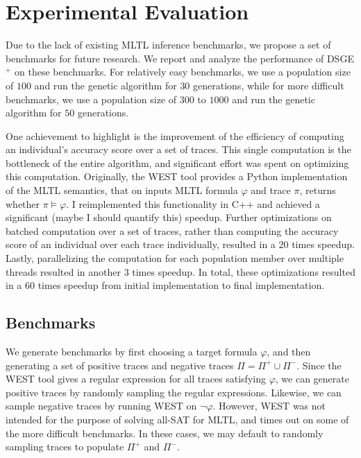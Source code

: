 \documentclass[runningheads]{llncs}
\renewcommand{\phi}{\varphi}
\begin{document}
\section{Experimental Evaluation}
Due to the lack of existing MLTL inference benchmarks, we propose a set of benchmarks for future research.
We report and analyze the performance of DSGE$^+$ on these benchmarks. 
For relatively easy benchmarks, we use a population size of $100$ and run the genetic algorithm for $30$ generations, while for more difficult benchmarks, we use a population size of $300$ to $1000$ and run the genetic algorithm for $50$ generations.

One achievement to highlight is the improvement of the efficiency of computing an individual's accuracy score over a set of traces.
This single computation is the bottleneck of the entire algorithm, and significant effort was spent on optimizing this computation.
Originally, the WEST tool \cite{Elwing_Gamboa-Guzman_Sorkin_Travesset_Wang_Rozier_2024} provides a Python implementation of the MLTL semantics, that on inputs MLTL formula $\phi$ and trace $\pi$, returns whether $\pi \vDash \phi$. 
I reimplemented this functionality in C++ and achieved a significant (maybe I should quantify this) speedup.
Further optimizations on batched computation over a set of traces, rather than computing the accuracy score of an individual over each trace individually, resulted in a $20$ times speedup. 
Lastly, parallelizing the computation for each population member over multiple threads resulted in another $3$ times speedup. In total, these optimizations resulted in a $60$ times speedup from initial implementation to final implementation.

\subsection{Benchmarks}
We generate benchmarks by first choosing a target formula $\phi$, and then generating a set of positive traces and negative traces $\Pi = \Pi^+ \cup \Pi^-$. 
Since the WEST tool \cite{Elwing_Gamboa-Guzman_Sorkin_Travesset_Wang_Rozier_2024} gives a regular expression for all traces satisfying $\phi$, we can generate positive traces by randomly sampling the regular expressions. 
Likewise, we can sample negative traces by running WEST on $\neg \phi$. 
However, WEST was not intended for the purpose of solving all-SAT for MLTL, and times out on some of the more difficult benchmarks.
In these cases, we may default to randomly sampling traces to populate $\Pi^+$ and $\Pi^-$.
\end{document}
